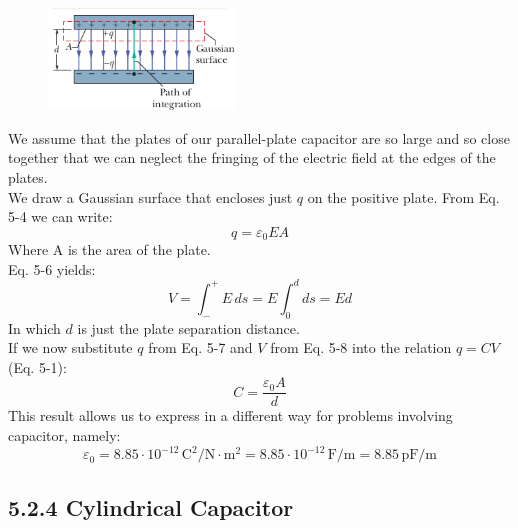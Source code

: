 \documentclass[12pt, a4paper]{article}
\begin{document}
		\begin{figure}
			\centering
			\includegraphics[width=5cm]{Physics2_PNGs/capacitor-charging-closeup.png}
			\caption*{}
			\label{fig:capacitor-charging-closeup.png}
		\end{figure}
		We assume that the plates of our parallel-plate capacitor are so large and so close together that we can neglect the fringing of the electric field at the edges of the plates. \\
		We draw a Gaussian surface that encloses just $q$ on the positive plate. From Eq. 5-4 we can write:
		\begin{equation*}
			q = \varepsilon_0 EA
			\tag{5-7}
		\end{equation*}
		Where A is the area of the plate. \\
		Eq. 5-6 yields:
		\begin{equation*}
			V = \int_{-}^{+} E \, ds = E \int_{0}^{d} ds = Ed
			\tag{5-8}
		\end{equation*}
		In which $d$ is just the plate separation distance. \\
		If we now substitute $q$ from Eq. 5-7 and $V$ from Eq. 5-8 into the relation $q = CV$ (Eq. 5-1):
		\[
				C = \frac{\varepsilon_0 A}{d}
				\tag{Parallel-Plate Capacitor, 5-9}
		\]
		This result allows us to express in a different way for problems involving capacitor, namely:
		\[
			\varepsilon_0 = 8.85 \cdot 10^{-12} \, \text{C}^2 / \text{N} \cdot \text{m}^2
						  = 8.85 \cdot 10^{-12} \, \text{F/m} = 8.85 \, \text{pF/m}
			\tag{5-10}
		\]



		\subsection*{5.2.4 Cylindrical Capacitor}
\end{document}
